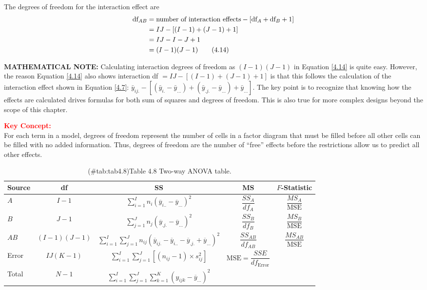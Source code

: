 \documentclass[
]{report}
\begin{document}
The degrees of freedom for the interaction effect are
\begin{align}\label{4.14}
\text{df}_{AB} &= \text{number of interaction effects} - [\text{df}_A + \text{df}_B + 1] \notag \\
&= IJ - [(I-1) + (J-1) + 1] \notag \\
&= IJ - I - J + 1 \notag \\
&= (I-1)(J-1)
\tag{4.14}
\end{align}

\large

\textbf{MATHEMATICAL NOTE:}
Calculating interaction degrees of freedom as \((I-1)(J-1)\) in Equation \ref{4.14} is quite easy. However, the reason Equation \ref{4.14} also shows interaction df \(= IJ - [(I-1) + (J-1) + 1]\) is that this follows the calculation of the interaction effect shown in Equation \ref{4.7}: \(\bar{y}_{ij.} - [(\bar{y}_{i.} - \bar{y}_{...}) + (\bar{y}_{.j.} - \bar{y}_{...}) + \bar{y}_{...}]\). The key point is to recognize that knowing how the effects are calculated drives formulas for both sum of squares and degrees of freedom. This is also true for more complex designs beyond the scope of this chapter.
\normalsize

\large

\textbf{\textcolor{red}{Key Concept:}}\\
\color{red}
For each term in a model, degrees of freedom represent the number of cells in a factor diagram that must be filled before all other cells can be filled with no added information. Thus, degrees of freedom are the number of ``free'' effects before the restrictions allow us to predict all other effects.
\color{black}
\normalsize

\begin{table}[!h]
\centering
\caption{(\#tab:tab4.8)Table 4.8 Two-way ANOVA table.}
\centering
\begin{tabular}[t]{lcccc}
\toprule
Source & df & SS & MS & $F$-Statistic\\
\midrule
$A$ & $I - 1$ & $\displaystyle\sum_{i=1}^{I} n_i (\overline{y}_{i..} - \overline{y}_{...})^2$ & $\dfrac{SS_A}{df_A}$ & $\dfrac{MS_A}{\text{MSE}}$\\
$B$ & $J - 1$ & $\displaystyle\sum_{j=1}^{J} n_j (\overline{y}_{.j.} - \overline{y}_{...})^2$ & $\dfrac{SS_B}{df_B}$ & $\dfrac{MS_B}{\text{MSE}}$\\
$AB$ & $(I-1)(J-1)$ & $\displaystyle\sum_{i=1}^{I}\sum_{j=1}^{J} n_{ij}(\overline{y}_{ij.} - \overline{y}_{i..} - \overline{y}_{.j.} + \overline{y}_{...})^2$ & $\dfrac{SS_{AB}}{df_{AB}}$ & $\dfrac{MS_{AB}}{\text{MSE}}$\\
Error & $IJ(K-1)$ & $\displaystyle\sum_{i=1}^I\sum_{j=1}^J [(n_{ij} - 1) \times s^2_{ij}]$ & $\text{MSE} = \dfrac{SSE}{df_{\text{Error}}}$ & \\
Total & $N-1$ & $\displaystyle\sum_{i=1}^I\sum_{j=1}^J\sum_{k=1}^K (y_{ijk} - \overline{y}_{...})^2$ &  & \\
\bottomrule
\end{tabular}
\end{table}
\end{document}
